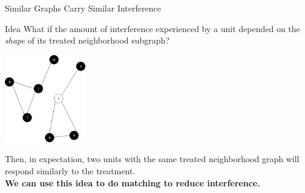 \documentclass[newPxFont,numfooter,sectionpages]{beamer}
\begin{document}
\begin{frame}{Similar Graphs Carry Similar Interference}
\begin{alertblock}{Idea}
What if the amount of interference experienced by a unit depended on the \textit{shape} of its treated neighborhood subgraph?
\end{alertblock}
\begin{center}
\includegraphics[height=1.5in]{graph2.png}
\end{center}
Then, in expectation, two units with the same treated neighborhood graph will respond similarly to the treatment. \\
\textbf{We can use this idea to do matching to reduce interference.}
\end{frame}
\end{document}
